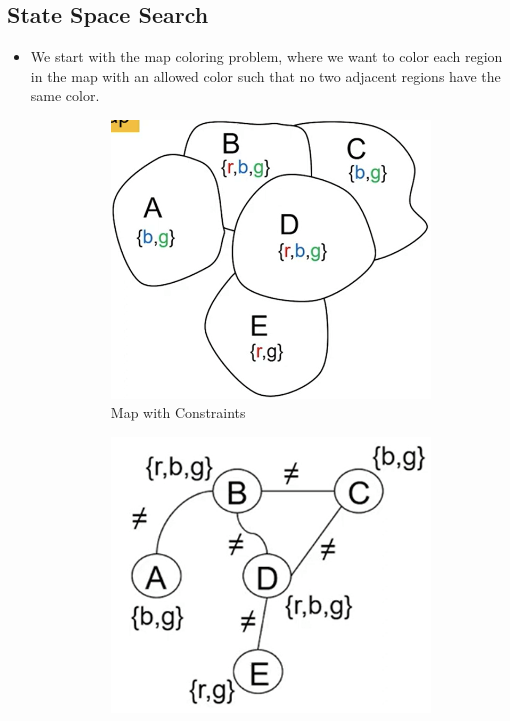 \documentclass[a4paper]{article}
\begin{document}
\subsection{State Space Search}
\begin{itemize}
    \item We start with the map coloring problem, where we want to color each region in the map with an allowed color such that no two adjacent regions have the same color.
    \begin{figure}[H]
        \centering
        \begin{subfigure}[b]{0.45\textwidth}
            \includegraphics[width=1\textwidth]{Degree/static/AI_map_colors.png}
            \caption{Map with Constraints}
            \label{fig:AI-map-constraint}
        \end{subfigure}
        \hfill
        \begin{subfigure}[b]{0.45\textwidth}
            \includegraphics[width=1\textwidth]{Degree/static/AI_constraint_graph.png}

\end{subfigure}
\end{figure}
\end{itemize}
\end{document}
